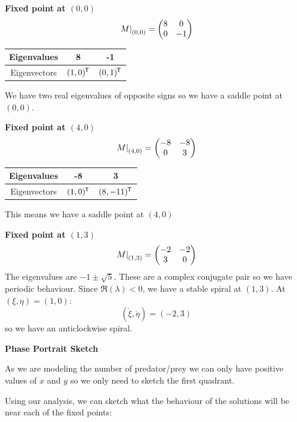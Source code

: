 \documentclass[../main.tex]{subfiles}
\begin{document}
\begin{example}
  \textbf{Fixed point at $(0, 0)$}
  \[
    \left. M \right|_{(0, 0)} = \begin{pmatrix}
    8 & 0 \\
    0 & -1 \\
    \end{pmatrix}
  \]
  \begin{center}
  \begin{tabular}{c|c|c}
  Eigenvalues & 8 & -1 \\
  \hline
  Eigenvectors & $(1, 0)^{{\mkern-1.5mu\mathsf{T}}}$ & $(0, 1)^{{\mkern-1.5mu\mathsf{T}}}$
  \end{tabular}
  \end{center}
  We have two real eigenvalues of opposite signs so we have a saddle point at $(0, 0)$.

  \textbf{Fixed point at $(4, 0)$}
  \[
    \left. M \right|_{(4, 0)} = \begin{pmatrix}
    -8 & -8 \\
    0 & 3 \\
    \end{pmatrix}
  \]
  \begin{center}
  \begin{tabular}{c|c|c}
  Eigenvalues & -8 & 3 \\
  \hline
  Eigenvectors & $(1, 0)^{{\mkern-1.5mu\mathsf{T}}}$ & $(8, -11)^{{\mkern-1.5mu\mathsf{T}}}$
  \end{tabular}
  \end{center}
  This means we have a saddle point at $(4, 0)$

  \textbf{Fixed point at $(1, 3)$}
  \[
    \left. M \right|_{(1, 3)} = \begin{pmatrix}
    -2 & -2 \\
    3 & 0 \\
    \end{pmatrix}
  \]
  The eigenvalues are $-1 \pm \sqrt{5}$.
  These are a complex conjugate pair so we have periodic behaviour.
  Since $\Re(\lambda) < 0$, we have a stable spiral at $(1, 3)$.
  At $(\xi, \eta) = (1, 0)$:
  \[
    (\dot{\xi}, \dot{\eta}) = (-2, 3)
  \]
  so we have an anticlockwise spiral.

  \textbf{Phase Portrait Sketch}\par
  As we are modeling the number of predator/prey we can only have positive values of $x$ and $y$ so we only need to sketch the first quadrant.

  Using our analysis, we can sketch what the behaviour of the solutions will be near each of the fixed points:
  \begin{center}
\end{center}
\end{example}
\end{document}
